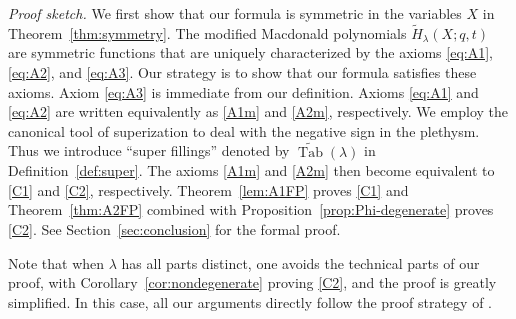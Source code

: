 \documentclass[ALCO,Unicode]{cedram}
\DeclareMathOperator{\PQT}{Tab}
\begin{document}
\noindent\emph{Proof sketch.} We first show that our formula is symmetric in the variables $X$ in Theorem~\ref{thm:symmetry}. The modified Macdonald polynomials $\widetilde{H}_{\lambda}(X;q,t)$ are symmetric functions that are uniquely characterized by the axioms \eqref{eq:A1}, \eqref{eq:A2}, and \eqref{eq:A3}. Our strategy is to show that our formula satisfies these axioms. Axiom \eqref{eq:A3} is immediate from our definition. Axioms \eqref{eq:A1} and \eqref{eq:A2} are written equivalently as \eqref{A1m} and \eqref{A2m}, respectively. We employ the canonical tool of superization to deal with the negative sign in the plethysm. Thus we introduce ``super fillings'' denoted by $\widetilde{\PQT}(\lambda)$ in Definition~\ref{def:super}. The axioms \eqref{A1m} and \eqref{A2m} then become equivalent to \eqref{C1} and \eqref{C2}, respectively. Theorem~\ref{lem:A1FP} proves \eqref{C1} and Theorem~\ref{thm:A2FP} combined with Proposition~\ref{prop:Phi-degenerate} proves \eqref{C2}. See Section~\ref{sec:conclusion} for the formal proof.

\begin{remark}
Note that when $\lambda$ has all parts distinct, one avoids the technical parts of our proof, with Corollary~\ref{cor:nondegenerate} proving \eqref{C2}, and the proof is greatly simplified. In this case, all our arguments directly follow the proof strategy of \cite[Theorem 2.2]{HHL05}.
\end{remark}
\end{document}
